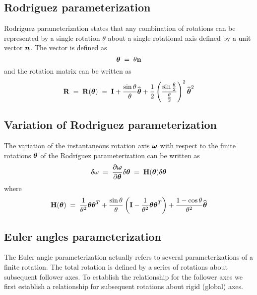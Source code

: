 \subsection{Rodriguez parameterization}

Rodriguez parameterization states that any combination of rotations can be
represented by a single rotation $\theta$ about a single rotational axis
defined by a unit vector $\boldsymbol{n}$.
The vector is defined as
%
\begin{equation}
{\boldsymbol{\theta}} \;=\; \theta{\bf n}
\end{equation}
%
and the rotation matrix can be written as
\begin{equation}
{\bf R} \;=\; {\bf R}({\boldsymbol{\theta}}) \;=\;
{\bf I} + \frac{\sin\theta}{\theta}\widehat{\boldsymbol{\theta}} +
\frac{1}{2}\left(\frac{\sin\frac{\theta}{2}}{\frac{\theta}{2}}\right)^2
\widehat{\boldsymbol{\theta}}^2
\label{eq:RodriguesDef}
\end{equation}

\subsection{Variation of Rodriguez parameterization}

The variation of the instantaneous rotation axis $\boldsymbol{\omega}$ with respect to the
finite rotations $\boldsymbol{\theta}$ of the Rodriguez parameterization can be written as
%
\begin{equation}
\delta{\bf \omega} \;=\;
\frac{\partial\boldsymbol{\omega}}{\partial\boldsymbol{\theta}} \delta{\boldsymbol{\theta}} \;=\;
{\bf H}({\boldsymbol{\theta}}) \delta{\boldsymbol{\theta}}
\label{eq:DomegaDthetaDef}
\end{equation}
%
where
%
\begin{equation}
{\bf H}({\boldsymbol{\theta}}) \;=\;
\frac{1}{\theta^2}{\boldsymbol{\theta}}{\boldsymbol{\theta}}^T + \frac{\sin\theta}{\theta}
\left({\bf I}-\frac{1}{\theta^2}{\boldsymbol{\theta}}{\boldsymbol{\theta}}^T\right) +
\frac{1-\cos\theta}{\theta^2}
{\bf \widehat{\boldsymbol{\theta}}}
\label{eq:DomegaDtheta}
\end{equation}
%

\subsection{Euler angles parameterization}
\label{subs:Euler angles}

The Euler angle parameterization actually refers to several parameterizations
of a finite rotation.
The total rotation is defined by a series of rotations about subsequent follower axes.
To establish the relationship for the follower axes we first establish
a relationship for subsequent rotations about rigid (global) axes.


